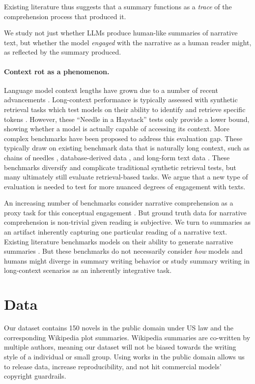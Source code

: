\documentclass{article} %
\begin{document}
Existing literature thus suggests that a summary functions as a \textit{trace} of the comprehension process that produced it.

We study not just whether LLMs produce human-like summaries of narrative text, but whether the model \textit{engaged} with the narrative as a human reader might, as reflected by the summary produced.

\paragraph{Context rot as a phenomenon.}
Language model context lengths have grown due to a number of recent advancements \citep{suRoFormerEnhancedTransformer2023,zaheer2020big,gu2024mamba,lieber2024jamba}.
Long-context performance is typically assessed with synthetic retrieval tasks which test models on their ability to identify and retrieve specific tokens \citep{mohtashami2023randomaccess,li-etal-2024-loogle}. However, these ``Needle in a Haystack'' tests only provide a lower bound, showing whether a model is actually capable of accessing its context.
More complex benchmarks have been proposed to address this evaluation gap.
These typically draw on existing benchmark data that is naturally long context, such as chains of needles \citep{hsiehruler}, database-derived data \citep{yuanLVEvalBalancedLongContext2024,chenLongLeaderComprehensiveLeaderboard2025}, and long-form text data \citep{wang2024leave}.
These benchmarks diversify and complicate traditional synthetic retrieval tests, but many ultimately still evaluate retrieval-based tasks.
We argue that a new type of evaluation is needed to test for more nuanced degrees of engagement with texts.

An increasing number of benchmarks consider narrative comprehension as a proxy task for this conceptual engagement \citep{karpinska-etal-2024-one,bonomo-etal-2025-literaryqa,kocisky-etal-2018-narrativeqa}.
But ground truth data for narrative comprehension is non-trivial given reading is subjective.
We turn to summaries as an artifact inherently capturing one particular reading of a narrative text.
Existing literature benchmarks models on their ability to generate narrative summaries \citep{kryscinski2021booksum,zhao2023narrasumlargescaledatasetabstractive}.
But these benchmarks do not necessarily consider \textit{how} models and humans might diverge in summary writing behavior or study summary writing in long-context scenarios as an inherently integrative task.


\section{Data}
Our dataset contains 150 novels in the public domain under US law and the corresponding Wikipedia plot summaries. Wikipedia summaries are co-written by multiple authors, meaning our dataset will not be biased towards the writing style of a individual or small group. Using works in the public domain allows us to release data, increase reproducibility, and not hit commercial models' copyright guardrails.
\end{document}
